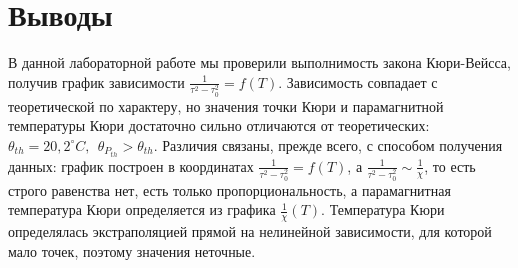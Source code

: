 \documentclass[a4paper, 12pt]{article}
\begin{document}
	\section*{Выводы}
	В данной лабораторной работе мы проверили выполнимость закона Кюри-Вейсса, получив график зависимости $\frac{1}{\tau^2 - \tau_0^2} = f(T)$. Зависимость совпадает с теоретической по характеру, но значения точки Кюри и парамагнитной температуры Кюри достаточно сильно отличаются от теоретических: $\theta_{th} = 20,2^{\circ}C, \ \ \theta_{P_{th}} > \theta_{th}$. Различия связаны, прежде всего, с способом получения данных: график построен в координатах $\frac{1}{\tau^2 - \tau_0^2} = f(T)$, а $\frac{1}{\tau^2 - \tau_0^2} \sim \frac{1}{\chi}$, то есть строго равенства нет, есть только пропорциональность, а парамагнитная температура Кюри определяется из графика $\frac{1}{\chi}(T)$. Температура Кюри определялась экстраполяцией прямой на нелинейной зависимости, для которой мало точек, поэтому значения неточные.
\end{document}
